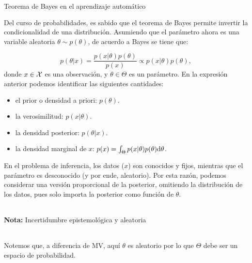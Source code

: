\documentclass[9pt, handout]{beamer}
\begin{document}
\begin{frame}{Teorema de Bayes en el aprendizaje automático}

Del curso de probabilidades, es sabido que el teorema de Bayes permite invertir la condicionalidad de una distribución. Asumiendo que el parámetro  ahora es una variable aleatoria $\theta\sim p(\theta)$, de acuerdo a Bayes se tiene que:

\begin{equation*}
	p(\theta|x) = \frac{p(x|\theta)p(\theta)}{p(x)} \propto p(x|\theta)p(\theta),\label{eq:Bayes}
\end{equation*}
donde $x\in{\mathcal X}$ es una observación, y $\theta\in\Theta$ es un parámetro. \pause En la expresión anterior podemos identificar las siguientes cantidades:
\begin{itemize}
	\item el prior o densidad a priori: $p(\theta)$. \pause
	\item la verosimilitud: $p(x|\theta)$. \pause
	\item la densidad posterior: $p(\theta|x)$. \pause
	\item la densidad marginal de $x$: $p(x) = \int_\Theta p(x|\theta)p(\theta){\text d}\theta$. \pause
\end{itemize} 

En el problema de inferencia, los datos ($x$) son conocidos y fijos, mientras que el parámetro es desconocido (y por ende, aleatorio). Por esta razón, podemos considerar una versión proporcional de la posterior, omitiendo la distribución de los datos, pues solo importa la posterior como función de $\theta$.\\~\ \pause

\textbf{Nota:} Incertidumbre epistemológica y aleatoria\\~\

Notemos que, a diferencia de MV, aquí $\theta$ es aleatorio por lo que $\Theta$ debe ser un espacio de probabilidad.
\end{frame}
\end{document}
